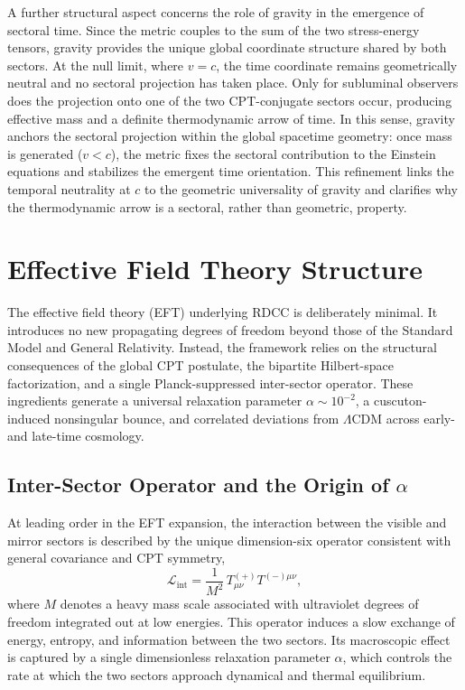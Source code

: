 \documentclass[11pt,a4paper]{article}
\begin{document}
\vspace{1.0em}

A further structural aspect concerns the role of gravity in the emergence of
sectoral time. Since the metric couples to the sum of the two stress-energy
tensors, gravity provides the unique global coordinate structure shared by both
sectors. At the null limit, where $v = c$, the time coordinate remains
geometrically neutral and no sectoral projection has taken place. Only for
subluminal observers does the projection onto one of the two CPT-conjugate
sectors occur, producing effective mass and a definite thermodynamic arrow of
time. In this sense, gravity anchors the sectoral projection within the global
spacetime geometry: once mass is generated ($v < c$), the metric fixes the
sectoral contribution to the Einstein equations and stabilizes the emergent
time orientation. This refinement links the temporal neutrality at $c$ to the
geometric universality of gravity and clarifies why the thermodynamic arrow is
a sectoral, rather than geometric, property.


\section{Effective Field Theory Structure}

The effective field theory (EFT) underlying RDCC is deliberately minimal. It
introduces no new propagating degrees of freedom beyond those of the Standard
Model and General Relativity. Instead, the framework relies on the structural
consequences of the global CPT postulate, the bipartite Hilbert-space
factorization, and a single Planck-suppressed inter-sector operator. These
ingredients generate a universal relaxation parameter \(\alpha \sim 10^{-2}\), a
cuscuton-induced nonsingular bounce, and correlated deviations from
\(\Lambda\)CDM across early- and late-time cosmology.


\subsection{Inter-Sector Operator and the Origin of \texorpdfstring{\(\alpha\)}{α}}

At leading order in the EFT expansion, the interaction between the visible and
mirror sectors is described by the unique dimension-six operator consistent with
general covariance and CPT symmetry,
\begin{equation}
    \mathcal{L}_{\mathrm{int}}
        = \frac{1}{M^{2}}\,
          T^{(+)}_{\mu\nu} T^{(-)\mu\nu},
\end{equation}
where \(M\) denotes a heavy mass scale associated with ultraviolet degrees of
freedom integrated out at low energies. This operator induces a slow exchange of
energy, entropy, and information between the two sectors. Its macroscopic effect
is captured by a single dimensionless relaxation parameter \(\alpha\), which
controls the rate at which the two sectors approach dynamical and thermal
equilibrium.
\end{document}
